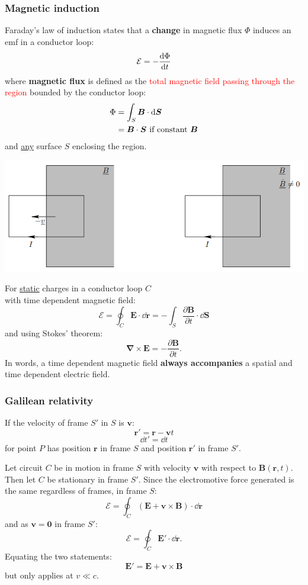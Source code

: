 \documentclass{article}
\newcommand{\vc}[1]{\boldsymbol{#1}}
\begin{document}
\begin{multicols*}{3}
\subsubsection*{Magnetic induction}
Faraday's law of induction states that
a \textbf{change} in magnetic flux $\Phi$ induces an emf
in a conductor loop:
$$\mathcal{E}=-\dv{\Phi}{t}$$
where \textbf{magnetic flux} is defined as the 
\textcolor{red}{total magnetic field passing through the region}
bounded by the conductor loop:
\begin{align*}
    \Phi
    &=\int_S\vc{B}\cdot\dd\vc{S} \\
    &=\vc{B}\cdot\vc{S}\hspace{0.05in}
    \text{if constant $\vc{B}$}
\end{align*}
and \underline{any} surface $S$ enclosing the region.
\begin{center}
    \includegraphics[scale=0.55]{f10.png}
\end{center}
For \underline{static} charges in a conductor loop $C$ \\
with time dependent magnetic field:
$$\mathcal{E}=\oint_C\vc{E}\cdot\dd\vc{r}
=-\int_S\frac{\partial\vc{B}}{\partial t}
\cdot\dd\vc{S}$$
and using Stokes' theorem:
$$\vc{\nabla}\times\vc{E}=-\frac{\partial\vc{B}}{\partial t}.$$
In words, a time dependent magnetic field \textbf{always
accompanies} a spatial and time dependent electric field.

\subsubsection*{Galilean relativity}
If the velocity of frame $S'$ in $S$ is $\vc{v}$:
$$\vc{r'}=\vc{r}-\vc{v}t$$
$$\dd t'=\dd t$$
for point $P$ has position $\vc{r}$ in frame $S$
and position $\vc{r}'$ in frame $S'$.

Let circuit $C$ be in motion in frame $S$
with velocity $\vc{v}$ with respect to $\vc{B}(\vc{r},t)$.
Then let $C$ be stationary in frame $S'$.
Since the electromotive force generated is the same
regardless of frames, in frame $S$:
$$\mathcal{E}=\oint_C(\vc{E}+\vc{v}\times\vc{B})\cdot\dd\vc{r}$$
and as $\vc{v}=\vc{0}$ in frame $S'$:
$$\mathcal{E}=\oint_C\vc{E}'\cdot\dd\vc{r}.$$
Equating the two statements:
$$\vc{E}'=\vc{E}+\vc{v}\times\vc{B}$$
but only applies at $v\ll c$.


\end{multicols*}
\end{document}
